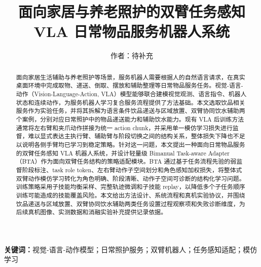 \documentclass[UTF8,a4paper,zihao=5,scheme=chinese]{ctexart}
\title{\zihao{3}\bfseries 面向家居与养老照护的双臂任务感知 VLA 日常物品服务机器人系统}
\author{\zihao{5}作者：待补充}
\date{}
\numberwithin{figure}{section}
\numberwithin{table}{section}
\begin{document}
\maketitle
\thispagestyle{empty}
\clearpage

\begin{abstract}
面向家居生活辅助与养老照护等场景，服务机器人需要根据人的自然语言请求，在真实桌面环境中完成取物、递送、倒取、摆放和辅助整理等日常物品服务任务。视觉-语言-动作（Vision-Language-Action, VLA）模型能够联合建模视觉观测、语言指令、机器人状态和连续动作，为服务机器人学习复合服务流程提供了方法基础。本文选取饮品相关服务作为实验任务，并将其拆解为语言条件饮品递送与区域放置、双臂协同饮水辅助两个案例，分别对应日常照护中的物品递送能力和辅助饮水能力。现有 VLA 后训练方法通常将左右臂和夹爪动作拼接为统一 action chunk，并采用单一模仿学习损失进行监督，难以显式表达主执行臂、辅助臂与阶段切换之间的结构关系，整体损失下降也不足以说明各侧手臂均已学习到稳定策略。针对这一问题，本文提出一种面向日常物品服务的双臂任务感知 VLA 机器人系统，并设计轻量级 Bimanual Task-aware Adapter（BTA）作为面向双臂任务结构的策略适配模块。BTA 通过基于任务流程先验的弱监督阶段标注、task role token、左右臂动作子空间划分和角色感知加权损失，将整体式双臂动作模仿学习转化为角色明确、阶段清晰、动作子空间可诊断的结构化学习问题。训练策略采用子技能均衡采样、完整轨迹微调和子技能 replay，以降低多个子任务顺序训练可能造成的技能覆盖风险。本文给出方法设计、系统流程和真机实验协议，并围绕饮品递送与区域放置、双臂协同饮水辅助两类任务设置过程观察项和失败诊断维度，为后续真机图像、实测数据和消融实验补充提供记录依据。
\end{abstract}

\noindent\textbf{关键词：}视觉-语言-动作模型；日常照护服务；双臂机器人；任务感知适配；模仿学习
\end{document}
